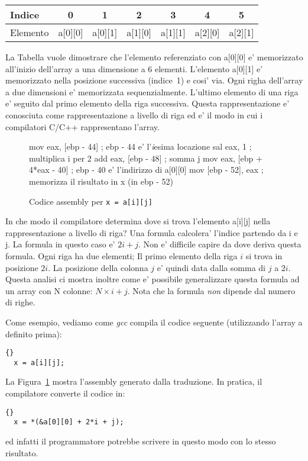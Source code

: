 \parbox{\textwidth}{
\vspace{0.5em}
\centering
\begin{tabular}{||l|c|c|c|c|c|c||}
\hline
Indice & 0 & 1 & 2 & 3 & 4 & 5 \\
\hline
Elemento & a[0][0] & a[0][1] & a[1][0] & a[1][1] & a[2][0] & a[2][1]  \\
\hline
\end{tabular}
\vspace{0.5em}
}
\noindent La Tabella vuole dimostrare che l'elemento referenziato con
{\code a[0][0]} e' memorizzato all'inizio dell'array a una dimensione
a 6 elementi. L'elemento {\code a[0][1]} e' memorizzato nella posizione
successiva (indice~1) e cosi' via. Ogni righa dell'array a due 
dimensioni e' memorizzata sequenzialmente. L'ultimo elemento di una
riga e' seguito dal primo elemento della riga successiva. Questa 
rappresentazione e' conosciuta come rappresentazione a livello di riga ed
e' il modo in cui i compilatori C/C++ rappresentano l'array. 

\begin{figure}[t]
\begin{AsmCodeListing}[]
   mov    eax, [ebp - 44]         ; ebp - 44 e' l'\emph{i}esima locazione
   sal    eax, 1                  ; multiplica i per 2
   add    eax, [ebp - 48]         ; somma j
   mov    eax, [ebp + 4*eax - 40] ; ebp - 40 e' l'indirizzo di a[0][0]
   mov    [ebp - 52], eax         ; memorizza il risultato in x (in ebp - 52)
\end{AsmCodeListing}
\caption{ Codice assembly per \lstinline|x = a[i][j]| \label{fig:aij}}
\end{figure}

In che modo il compilatore determina dove si trova l'elemento {\code a[i][j]} nella
rappresentazione a livello di riga? Una formula calcolera' l'indice partendo da
{\code i} e {\code j}. La formula in questo caso e' $2i + j$. Non e' difficile
capire da dove deriva questa formula. Ogni riga ha due elementi; Il primo
elemento della riga $i$ si trova in posizione $2i$. La posizione della
colonna $j$ e' quindi data dalla somma di $j$ a $2i$. Questa analisi ci mostra
inoltre come e' possibile generalizzare questa formula ad un array con 
{\code N} colonne: $N \times i + j$. Nota che la formula \emph{non} dipende
dal numero di righe.

Come esempio, vediamo come \emph{gcc} compila il codice seguente (utilizzando 
l'array {\code a} definito prima):
\begin{lstlisting}[stepnumber=0]{}
  x = a[i][j];
\end{lstlisting}
La Figura~\ref{fig:aij} mostra l'assembly generato dalla traduzione.
In pratica, il compilatore converte il codice in:
\begin{lstlisting}[stepnumber=0]{}
  x = *(&a[0][0] + 2*i + j);
\end{lstlisting}
ed infatti il programmatore potrebbe scrivere in questo modo con lo
stesso risultato.

